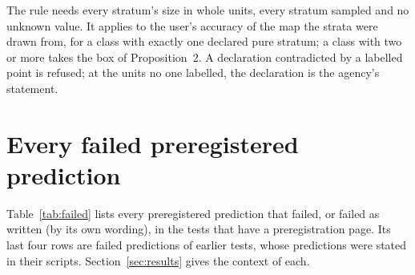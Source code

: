\documentclass[11pt,a4paper]{article}
\begin{document}
The rule needs every stratum's size in whole units, every stratum sampled and no unknown value. It applies to the
user's accuracy of the map the strata were drawn from, for a class with exactly one declared pure stratum; a class
with two or more takes the box of Proposition~2. A declaration contradicted by a labelled point is refused; at the
units no one labelled, the declaration is the agency's statement.

\section{Every failed preregistered prediction}
\label{app:failed}

Table~\ref{tab:failed} lists every preregistered prediction that failed, or failed as written (by its own wording),
in the tests that have a preregistration page. Its last four rows are failed predictions of earlier tests, whose
predictions were stated in their scripts. Section~\ref{sec:results} gives the context of each.
\end{document}
